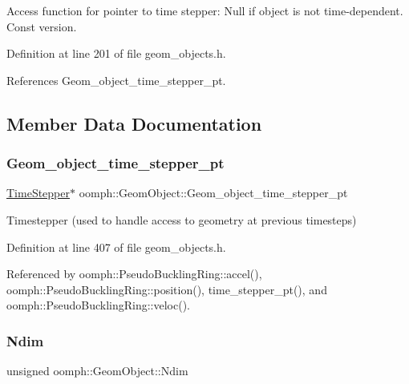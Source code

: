 Access function for pointer to time stepper\+: Null if object is not time-\/dependent. Const version. 



Definition at line 201 of file geom\+\_\+objects.\+h.



References Geom\+\_\+object\+\_\+time\+\_\+stepper\+\_\+pt.



\subsection{Member Data Documentation}
\mbox{\label{classoomph_1_1GeomObject_a158a36e0dbcaf236ffc351b76faaed53}} 
\subsubsection{\texorpdfstring{Geom\+\_\+object\+\_\+time\+\_\+stepper\+\_\+pt}{Geom\_object\_time\_stepper\_pt}}
{\footnotesize\ttfamily \hyperlink{classoomph_1_1TimeStepper}{Time\+Stepper}$\ast$ oomph\+::\+Geom\+Object\+::\+Geom\+\_\+object\+\_\+time\+\_\+stepper\+\_\+pt\hspace{0.3cm}{\ttfamily [protected]}}



Timestepper (used to handle access to geometry at previous timesteps) 



Definition at line 407 of file geom\+\_\+objects.\+h.



Referenced by oomph\+::\+Pseudo\+Buckling\+Ring\+::accel(), oomph\+::\+Pseudo\+Buckling\+Ring\+::position(), time\+\_\+stepper\+\_\+pt(), and oomph\+::\+Pseudo\+Buckling\+Ring\+::veloc().

\mbox{\label{classoomph_1_1GeomObject_a6351e2d8fbd54ff23498eb6f77c905cc}} 
\subsubsection{\texorpdfstring{Ndim}{Ndim}}
{\footnotesize\ttfamily unsigned oomph\+::\+Geom\+Object\+::\+Ndim\hspace{0.3cm}{\ttfamily [protected]}}



